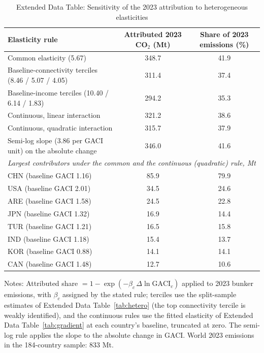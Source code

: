 \begin{table}[htbp]
\centering
\begin{threeparttable}
\caption{Extended Data Table: Sensitivity of the 2023 attribution to heterogeneous elasticities}
\label{tab:attr_sens}
\footnotesize
\begin{tabular}{lcc}
\toprule
Elasticity rule & Attributed 2023 CO$_2$ (Mt) & Share of 2023 emissions (\%) \\
\midrule
  Common elasticity (5.67) & 348.7 & 41.9 \\
  Baseline-connectivity terciles (8.46 / 5.07 / 4.05) & 311.4 & 37.4 \\
  Baseline-income terciles (10.40 / 6.14 / 1.83) & 294.2 & 35.3 \\
  Continuous, linear interaction & 321.2 & 38.6 \\
  Continuous, quadratic interaction & 315.7 & 37.9 \\
  Semi-log slope (3.86 per GACI unit) on the absolute change & 346.0 & 41.6 \\
\midrule
\multicolumn{3}{l}{\textit{Largest contributors under the common and the continuous (quadratic) rule, Mt}} \\
  CHN (baseline GACI 1.16) & 85.9 & 79.9 \\
  USA (baseline GACI 2.01) & 34.5 & 24.6 \\
  ARE (baseline GACI 1.58) & 24.5 & 22.8 \\
  JPN (baseline GACI 1.32) & 16.9 & 14.4 \\
  TUR (baseline GACI 1.21) & 16.5 & 15.8 \\
  IND (baseline GACI 1.18) & 15.4 & 13.7 \\
  KOR (baseline GACI 0.88) & 14.1 & 14.1 \\
  CAN (baseline GACI 1.48) & 12.7 & 10.6 \\
\bottomrule
\end{tabular}
\begin{tablenotes}[flushleft]
\footnotesize
\item Notes: Attributed share $= 1-\exp(-\beta_c\,\Delta\ln\mathrm{GACI}_c)$ applied to 2023 bunker emissions, with $\beta_c$ assigned by the stated rule; terciles use the split-sample estimates of Extended Data Table~\ref{tab:hetero} (the top connectivity tercile is weakly identified), and the continuous rules use the fitted elasticity of Extended Data Table~\ref{tab:gradient} at each country's baseline, truncated at zero. The semi-log rule applies the slope to the absolute change in GACI. World 2023 emissions in the 184-country sample: 833 Mt.
\end{tablenotes}
\end{threeparttable}
\end{table}


